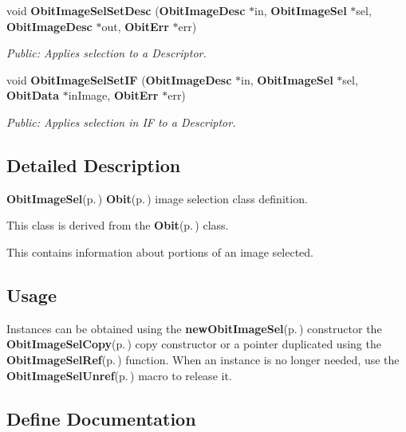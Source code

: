 \begin{CompactItemize}
void {\bf Obit\-Image\-Sel\-Set\-Desc} ({\bf Obit\-Image\-Desc} $\ast$in, {\bf Obit\-Image\-Sel} $\ast$sel, {\bf Obit\-Image\-Desc} $\ast$out, {\bf Obit\-Err} $\ast$err)
\begin{CompactList}\small\item\em Public: Applies selection to a Descriptor. \item\end{CompactList}\item 
void {\bf Obit\-Image\-Sel\-Set\-IF} ({\bf Obit\-Image\-Desc} $\ast$in, {\bf Obit\-Image\-Sel} $\ast$sel, {\bf Obit\-Data} $\ast$in\-Image, {\bf Obit\-Err} $\ast$err)
\begin{CompactList}\small\item\em Public: Applies selection in IF to a Descriptor. \item\end{CompactList}\end{CompactItemize}


\subsection{Detailed Description}
{\bf Obit\-Image\-Sel}{\rm (p.\,\pageref{structObitImageSel})} {\bf Obit}{\rm (p.\,\pageref{structObit})} image selection class definition. 

This class is derived from the {\bf Obit}{\rm (p.\,\pageref{structObit})} class.

This contains information about portions of an image selected.\subsection{Usage}\label{ObitImageSel_8h_ObitImageSelUsage}
Instances can be obtained using the {\bf new\-Obit\-Image\-Sel}{\rm (p.\,\pageref{ObitImageSel_8c_a6})} constructor the {\bf Obit\-Image\-Sel\-Copy}{\rm (p.\,\pageref{ObitImageSel_8c_a8})} copy constructor or a pointer duplicated using the {\bf Obit\-Image\-Sel\-Ref}{\rm (p.\,\pageref{ObitImageSel_8h_a1})} function. When an instance is no longer needed, use the {\bf Obit\-Image\-Sel\-Unref}{\rm (p.\,\pageref{ObitImageSel_8h_a0})} macro to release it.

\subsection{Define Documentation}
